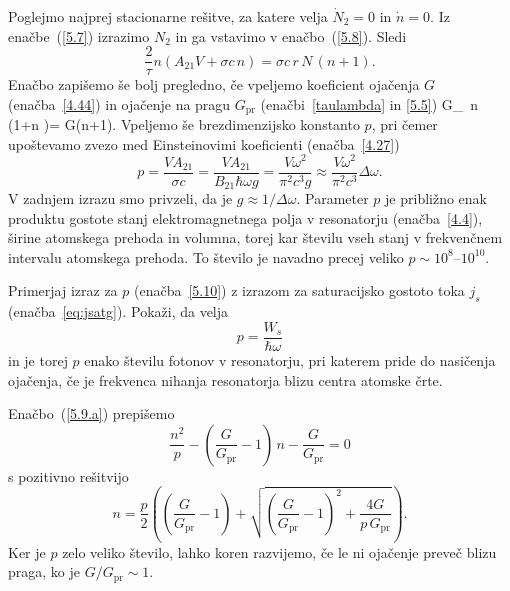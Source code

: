 Poglejmo najprej stacionarne rešitve, za katere velja $\dot{N}_{2}=0$ in 
$\dot{n}=0$. Iz enačbe~(\ref{5.7}) izrazimo $N_{2}$ in ga vstavimo v enačbo~(\ref{5.8}).
Sledi 
\begin{equation}
\frac{2}{\tau }n\left(A_{21}V+\sigma c\,n\right)=
\sigma c\, r\,N\,(n+1).
\label{5.9}
\end{equation}
Enačbo zapišemo še bolj pregledno, če vpeljemo koeficient ojačenja $G$ (enačba~\ref{4.44})
in ojačenje na pragu $G_\mathrm{pr}$ (enačbi~\ref{taulambda} in \ref{5.5})
\beq
G_\, n\, \left(1+n \right)= G(n+1).
\label{5.9.a}
\eeq
Vpeljemo še brezdimenzijsko konstanto $p$, pri čemer upoštevamo zvezo
med Einsteinovimi koeficienti (enačba~\ref{4.27})
\begin{equation}
p=\frac{VA_{21}}{\sigma c} = 
\frac{VA_{21}}{B_{21}\hbar \omega g}=\frac{V\omega ^{2}}{\pi
^{2}c^{3}g}\approx
\frac{V\omega ^{2}}{\pi ^{2}c^{3}}\Delta \omega.  
\label{5.10}
\end{equation}
V zadnjem izrazu smo privzeli, da je $g\approx 1/\Delta \omega $. 
Parameter $p$ je približno enak produktu 
gostote stanj elektromagnetnega polja v resonatorju (enačba~\ref{4.4}),
širine atomskega prehoda in volumna, torej kar številu vseh stanj 
v frekvenčnem intervalu atomskega prehoda. To število je navadno precej 
veliko $p \sim 10^{8}$--$10^{10}$. 

\begin{definition}
Primerjaj izraz za $p$ (enačba~\ref{5.10}) z izrazom za saturacijsko 
gostoto toka $j_s$ (enačba~\ref{eq:jsatg}). Pokaži, da velja
\begin{equation}
p = \frac{W_s}{\hbar \omega}
\end{equation}
in je torej $p$ enako številu fotonov v resonatorju, pri katerem pride 
do nasičenja ojačenja, če je frekvenca nihanja resonatorja blizu 
centra atomske črte. 
\end{definition}

Enačbo~(\ref{5.9.a}) prepišemo
\begin{equation}
\frac{n^2}{p}-(\frac{G}{G_\mathrm{pr}}-1)\,n-\frac{G}{G_\mathrm{pr}}=0
\label{5.11}
\end{equation}
s pozitivno rešitvijo 
\begin{equation}
n=\frac{p}{2}\left( \left(\frac{G}{G_\mathrm{pr}}-1\right)+\sqrt{\left(\frac{G}{G_\mathrm{pr}}
-1\right)^{2}+ \frac{4G}{p\,G_\mathrm{pr}}}\right).
\label{5.12}
\end{equation}
Ker je $p$ zelo veliko število, lahko koren razvijemo, če le ni ojačenje
preveč blizu praga, ko je $G/G_\mathrm{pr}\sim 1$. 

